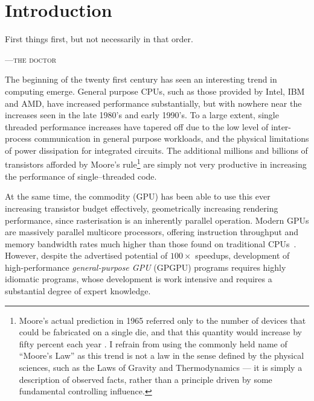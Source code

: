 
\chapter{Introduction}
\epigraph{First things first, but not necessarily in that order.}
{\textsc{---the doctor}}


The beginning of the twenty first century has seen an interesting trend in
computing emerge. General purpose CPUs, such as those provided by Intel, IBM and
AMD, have increased performance substantially, but with nowhere near the
increases seen in the late 1980's and early 1990's. To a large extent, single
threaded performance increases have tapered off due to the low level of
inter-process communication in general purpose workloads, and the physical
limitations of power dissipation for integrated circuits. The additional
millions and billions of transistors afforded by Moore's rule\footnote{Moore's
actual prediction in 1965 referred only to the number of devices that could be
fabricated on a single die, and that this quantity would increase by fifty
percent each year \cite{Moore:1965wc}. I refrain from using the commonly held
name of ``Moore's Law'' as this trend is not a law in the sense defined by the
physical sciences, such as the Laws of Gravity and Thermodynamics --- it is
simply a description of observed facts, rather than a principle driven by some
fundamental controlling influence.} are simply not very productive in increasing
the performance of single--threaded code.

At the same time, the commodity  (GPU) has been
able to use this ever increasing transistor budget effectively, geometrically
increasing rendering performance, since rasterisation is an inherently parallel
operation.
%
Modern GPUs are massively parallel multicore processors, offering instruction
throughput and memory bandwidth rates much higher than those found on
traditional CPUs~\cite{NVIDIA:2012wf}. However, despite the advertised potential
of $100\times$ speedups, development of high-performance \emph{general-purpose
GPU} (GPGPU)
programs requires highly idiomatic programs, whose development is work intensive
and requires a substantial degree of expert knowledge.


